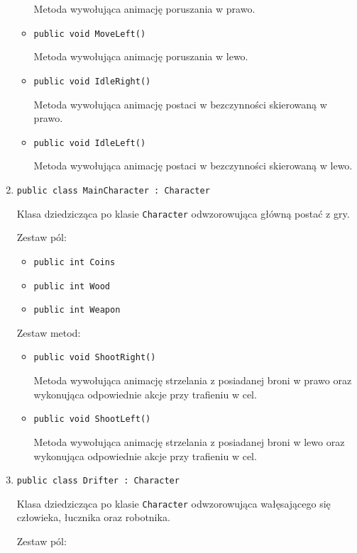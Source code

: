 \documentclass[12pt, a4paper]{article}
\begin{document}
\begin{enumerate}
\begin{itemize}
Metoda wywołująca animację poruszania w prawo.

\item \texttt{public void MoveLeft()}

Metoda wywołująca animację poruszania w lewo.

\item \texttt{public void IdleRight()}

Metoda wywołująca animację postaci w bezczynności skierowaną w prawo.

\item \texttt{public void IdleLeft()}

Metoda wywołująca animację postaci w bezczynności skierowaną w lewo.

\end{itemize}

\item \texttt{public class MainCharacter : Character}

Klasa dziedzicząca po klasie \texttt{Character} odwzorowująca główną postać z
gry.

Zestaw pól$\colon$

\begin{itemize}
\item \texttt{public int Coins}
\item \texttt{public int Wood}
\item \texttt{public int Weapon}
\end{itemize}

Zestaw metod$\colon$

\begin{itemize}
\item \texttt{public void ShootRight()}

Metoda wywołująca animację strzelania z posiadanej broni w prawo oraz 
wykonująca odpowiednie akcje przy trafieniu w cel.

\item \texttt{public void ShootLeft()}

Metoda wywołująca animację strzelania z posiadanej broni w lewo oraz 
wykonująca odpowiednie akcje przy trafieniu w cel.

\end{itemize}

\item \texttt{public class Drifter : Character}

Klasa dziedzicząca po klasie \texttt{Character} odwzorowująca wałęsającego
się człowieka, łucznika oraz robotnika.

Zestaw pól$\colon$


\end{enumerate}
\end{document}
